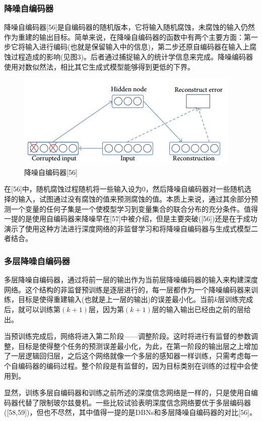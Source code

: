 \documentclass[a4paper]{article}
\begin{document}
\subsubsection{降噪自编码器}
降噪自编码器[56]是自编码器的随机版本，它将输入随机腐蚀，未腐蚀的输入仍然作为重建的输出目标。简单来说，在降噪自编码器的函数中有两个主要方面：第一步它将输入进行编码(也就是保留输入中的信息)，第二步还原自编码器在输入上腐蚀过程造成的影响(见图3)。后者通过捕捉输入的统计学信息来完成。降噪编码器使用对数似然法，相比其它生成式模型能够得到更低的下界。
\begin{figure}[ht]
	\centering
	\includegraphics[scale=0.6]{fig3.png}
	\caption{降噪自编码器[56]}
	\label{fig:label}
\end{figure}
在[56]中，随机腐蚀过程随机将一些输入设为0，然后降噪自编码器对一些随机选择的输入，试图通过没有腐蚀的值来预测腐蚀的值。本质上来说，通过其余部分预测一个变量的任何子集是一个使模型学习到变量集合的联合分布的充分条件。值得一提的是使用自编码器来降噪早在[57]中被介绍，但是主要突破([56])还是在于成功演示了使用这种方法进行深度网络的非监督学习和将降噪自编码器与生成式模型二者结合。

\subsubsection{多层降噪自编码器}
多层降噪自编码器，通过将前一层的输出作为当前层降噪编码器的输入来构建深度网络。这个结构的非监督预训练是逐层进行的，每一层都作为一个降噪编码器来训练，目标是使得重建输入(也就是上一层的输出)的误差最小化。当前$k$层训练完成后，就可以训练第$(k+1)$层，因为第$(k+1)$层的输入输出已经由之前的层给出。

当预训练完成后，网络将进入第二阶段——调整阶段。这时将进行有监督的参数调整，目标是使得整个任务的预测误差最小化，为此，在第一阶段的输出层之上增加了一层逻辑回归层，之后这个网络就像一个多层的感知器一样训练，只需考虑每一个自编码器的编码过程。整个阶段是有监督的，因为目标类别在训练的过程中会使用到。

显然，训练多层自编码器和训练之前所述的深度信念网络是一样的，只是使用自编码器代替了限制玻尔兹曼机。一些比较试验表明深度信念网络要优于多层编码器([58,59])，但也不尽然，其中值得一提的是DBNs和多层降噪自编码器的对比[56]。
\end{document}
